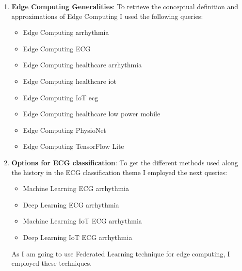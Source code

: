 \begin{enumerate}
    \item \textbf{Edge Computing Generalities}: To retrieve the conceptual definition and approximations of Edge Computing I used the following queries:
    \begin{itemize}
        \item Edge Computing arrhythmia
        \item Edge Computing ECG
        \item Edge Computing healthcare arrhythmia
        \item Edge Computing healthcare iot
        \item Edge Computing IoT ecg
        \item Edge Computing healthcare low power mobile
        \item Edge Computing PhysioNet
        \item Edge Computing TensorFlow Lite
    \end{itemize}
    \item \textbf{Options for ECG classification}: To get the different methods used along the history in the ECG classification theme I employed the next queries:
    \begin{itemize}
        \item Machine Learning ECG arrhythmia
        \item Deep Learning ECG arrhythmia
        \item Machine Learning IoT ECG arrhythmia
        \item Deep Learning IoT ECG arrhythmia
    \end{itemize}
    
    As I am going to use Federated Learning technique for edge computing, I employed these techniques. 
    

\end{enumerate}

